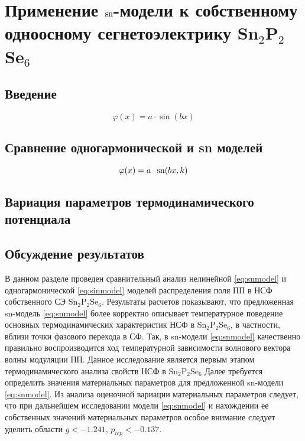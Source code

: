 
\chapter{Применение $\operatorname{sn}$-модели к собственному одноосному сегнетоэлектрику Sn$_2$P$_2$Se$_6$}\label{ch:appl}

\section{Введение}\label{sec:applintro}

\begin{equation}
\varphi(x) = a \cdot \sin(bx)
\label{eq:sinmodel}
\end{equation}

\section{Сравнение одногармонической и sn моделей}\label{sec:compare}

\begin{equation}
\varphi(x) = a \cdot \operatorname{sn}(bx, k)
\label{eq:snmodel}
\end{equation}

\section{Вариация параметров термодинамического потенциала}\label{sec:variate}

\section{Обсуждение результатов}\label{sec:discuss}

В данном разделе проведен сравнительный анализ нелинейной \eqref{eq:snmodel} и одногармонической \eqref{eq:sinmodel} моделей распределения поля ПП в НСФ собственного СЭ Sn$_2$P$_2$Se$_6$. Результаты расчетов показывают, что предложенная sn-модель \eqref{eq:snmodel} более корректно описывает температурное поведение основных термодинамических характеристик НСФ в Sn$_2$P$_2$Se$_6$, в частности, вблизи точки фазового перехода в СФ. Так, в sn-модели \eqref{eq:snmodel} качественно правильно воспроизводится ход температурной зависимости волнового вектора волны модуляции ПП.
Данное исследование является первым этапом термодинамического анализа свойств НСФ в Sn$_2$P$_2$Se$_6$ Далее требуется определить значения материальных параметров для предложенной sn-модели \eqref{eq:snmodel}. Из анализа оценочной вариации материальных параметров следует, что при дальнейшем исследовании модели \eqref{eq:snmodel} и нахождении ее собственных значений материальных параметров особое внимание следует уделить области $g < -1.241,\, p_{icp} < -0.137$.
